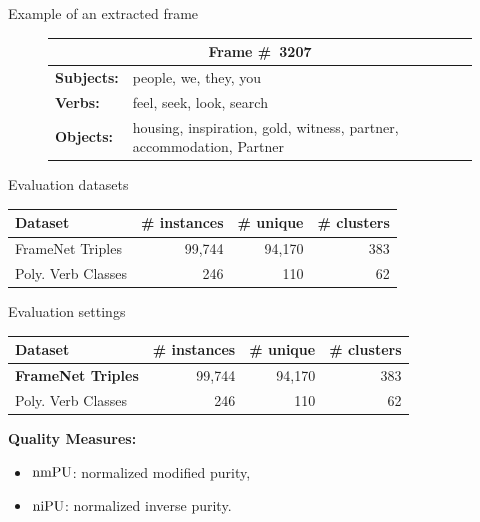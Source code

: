\begin{frame}{Example of an extracted frame}


\begin{figure}[htbp]
  \centering
  \begin{tabular}{lp{70mm}}\toprule
  \multicolumn{2}{c}{\textbf{Frame \#~3207}} \\\toprule
  \textbf{Subjects:} & people, we, they, you \\\midrule
    \textbf{Verbs:}    & feel, seek, look, search \\\midrule

  \textbf{Objects:}  & housing, inspiration, gold, witness, partner, accommodation, Partner \\\bottomrule
  \end{tabular}
\end{figure}


\end{frame}



\begin{frame}{Evaluation datasets}


\begin{tabular}{lrrr}
\textbf{Dataset} & \textbf{\# instances} & \textbf{\# unique} & \textbf{\# clusters} \\\toprule
FrameNet Triples   & 99,744 & 94,170 & 383 \\
Poly. Verb Classes &    246 &    110 & 62 \\
\end{tabular}
	
\end{frame}


\begin{frame}{Evaluation settings}


\begin{tabular}{lrrr}
\textbf{Dataset} & \textbf{\# instances} & \textbf{\# unique} & \textbf{\# clusters} \\\toprule
\textbf{\alert{FrameNet Triples}}   & 99,744 & 94,170 & 383 \\
Poly. Verb Classes &    246 &    110 & 62 \\
\end{tabular}

\pause 

\vspace{20pt}
\textbf{Quality Measures:}

\begin{itemize}
\item $\operatorname{\mathrm{nmPU}}$: normalized modified purity, 
\item $\operatorname{\mathrm{niPU}}$: normalized inverse purity.	
\end{itemize}

	
\end{frame}




